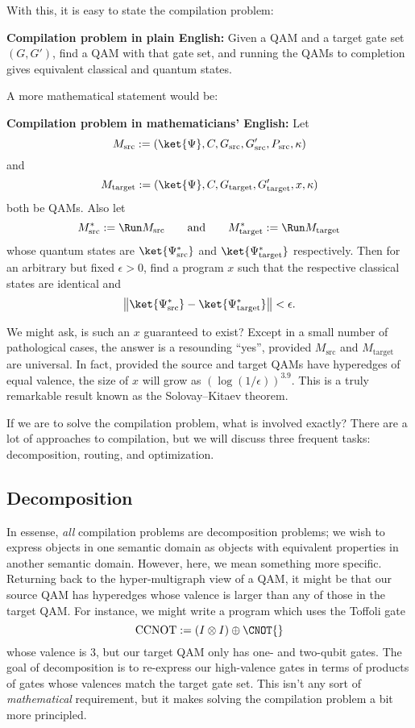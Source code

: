 With this, it is easy to state the compilation problem:
\begin{framed}
\noindent \textbf{Compilation problem in plain English:} Given a QAM and a target gate set $(G, G')$, find a QAM with that gate set, and running the QAMs to completion gives equivalent classical and quantum states.
\end{framed}
\noindent A more mathematical statement would be:
\begin{framed}
\noindent \textbf{Compilation problem in mathematicians' English:} Let \[M_{\textrm{src}} := (\ket{\Psi}, C, G_{\textrm{src}}, G'_{\textrm{src}}, P_{\textrm{src}}, \kappa)\] and \[M_{\textrm{target}} := (\ket{\Psi}, C, G_{\textrm{target}}, G'_{\textrm{target}}, x, \kappa)\] both be QAMs. Also let
\begin{displaymath}
M^*_{\textrm{src}} := \Run M_{\textrm{src}}\qquad\text{and}\qquad
M^*_{\textrm{target}} := \Run M_{\textrm{target}}
\end{displaymath}
whose quantum states are $\ket{\Psi^*_{\textrm{src}}}$ and $\ket{\Psi^*_{\textrm{target}}}$ respectively. Then for an arbitrary but fixed $\epsilon>0$, find a program $x$ such that the respective classical states are identical and
\begin{displaymath}
\left\Vert\ket{\Psi^*_{\textrm{src}}} - \ket{\Psi^*_{\textrm{target}}}\right\Vert < \epsilon.
\end{displaymath}
\end{framed}

We might ask, is such an $x$ guaranteed to exist? Except in a small number of pathological cases, the answer is a resounding ``yes'', provided $M_{\textrm{src}}$ and $M_{\textrm{target}}$ are universal. In fact, provided the source and target QAMs have hyperedges of equal valence, the size of $x$ will grow as $(\log (1/\epsilon))^{3.9}$. This is a truly remarkable result known as the Solovay--Kitaev theorem.

If we are to solve the compilation problem, what is involved exactly? There are a lot of approaches to compilation, but we will discuss three frequent tasks: decomposition, routing, and optimization.

\subsection{Decomposition}
In essense, \emph{all} compilation problems are decomposition problems; we wish to express objects in one semantic domain as objects with equivalent properties in another semantic domain. However, here, we mean something more specific. Returning back to the hyper-multigraph view of a QAM, it might be that our source QAM has hyperedges whose valence is larger than any of those in the target QAM. For instance, we might write a program which uses the Toffoli gate \[\textrm{CCNOT} := (I \otimes I) \oplus \CNOT{}\] whose valence is $3$, but our target QAM only has one- and two-qubit gates. The goal of decomposition is to re-express our high-valence gates in terms of products of gates whose valences match the target gate set. This isn't any sort of \emph{mathematical} requirement, but it makes solving the compilation problem a bit more principled.

